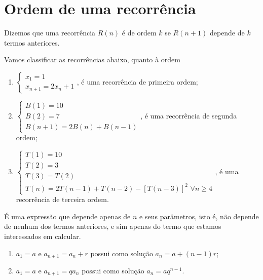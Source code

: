 	\section{Ordem de uma recorrência}
	\begin{defin}
		Dizemos que uma recorrência $R(n)$ é de ordem $k$ se $R(n+1)$ depende de $k$ termos anteriores.
	\end{defin}
	\begin{example} Vamos classificar as recorrências abaixo, quanto à ordem
	\begin{enumerate}
		\item[(a)] $\begin{cases}
		x_1 = 1\\
		x_{n+1} = 2x_n + 1
		\end{cases}
		$, é uma recorrência de primeira ordem; 
		\item[(b)] $\begin{cases}
		B(1) = 10\\
		B(2) = 7\\
		B(n+1) = 2B(n) + B(n-1)
		\end{cases}
		$, é uma recorrência de segunda ordem;
		\item[(c)] $\begin{cases}
		T(1) = 10\\
		T(2) = 3\\
		T(3) = T(2)\\
		T(n) = 2T(n-1) + T(n-2) - [T(n-3)]^2 \,\, \forall n \geq 4
		\end{cases}$, é uma recorrência de terceira ordem.
	\end{enumerate}

\end{example}
	\begin{defin}
		É uma expressão que depende apenas de $n$ e seus parâmetros, isto é, não depende de nenhum dos termos anteriores, e sim apenas do termo que estamos interessados em calcular.
	\end{defin}
	
	\begin{example} 
	\begin{enumerate}
		\item[(a)] $a_1 = a$ e $a_{n+1} = a_{n} + r$ possui como solução $a_n = a + (n-1)r$;
		\item[(b)] $a_1 = a$ e $a_{n+1} = qa_{n}$ possui como solução $a_n = aq^{n-1}$.
	\end{enumerate}

\end{example}
